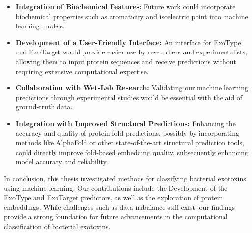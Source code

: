 \begin{itemize}
	\item \textbf{Integration of Biochemical Features:} Future work could incorporate biochemical properties such as aromaticity and isoelectric point into machine learning models.
	
	\item \textbf{Development of a User-Friendly Interface:} An interface for ExoType and ExoTarget would provide easier use by researchers and experimentalists, allowing them to input protein sequences and receive predictions without requiring extensive computational expertise.
	
	\item \textbf{Collaboration with Wet-Lab Research:} Validating our machine learning predictions through experimental studies would be essential with the aid of ground-truth data.
	
	\item \textbf{Integration with Improved Structural Predictions:} Enhancing the accuracy and quality of protein fold predictions, possibly by incorporating methods like AlphaFold or other state-of-the-art structural prediction tools, could directly improve fold-based embedding quality, subsequently enhancing model accuracy and reliability.
\end{itemize}

In conclusion, this thesis investigated methods for classifying bacterial exotoxins using machine learning. Our contributions include the Development of the ExoType and ExoTarget predictors, as well as the exploration of protein embeddings. While challenges such as data imbalance still exist, our findings provide a strong foundation for future advancements in the computational classification of bacterial exotoxins.